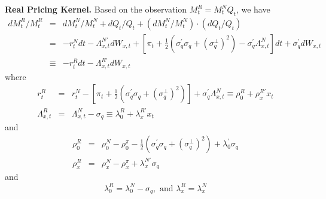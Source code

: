 \documentclass{article}
\begin{document}
\textbf{Real Pricing Kernel.} Based on the observation $%
M_{t}^{R}=M_{t}^{N}Q_{t}$, we have%
\begin{eqnarray*}
dM_{t}^{R}/M_{t}^{R} &=&dM_{t}^{N}/M_{t}^{N}+dQ_{t}/Q_{t}+\left(
dM_{t}^{N}/M_{t}^{N}\right) \cdot \left( dQ_{t}/Q_{t}\right)  \\
&=&-r_{t}^{N}dt-\Lambda _{x,t}^{N\prime }dW_{x,t}+\left[ \pi _{t}+\frac{1}{2}%
\left( \sigma _{q}^{\prime }\sigma _{q}+\left( \sigma _{q}^{\bot }\right)
^{2}\right) -\sigma _{q}^{\prime }\Lambda _{x,t}^{N}\right] dt+\sigma
_{q}^{\prime }dW_{x,t} \\
&\equiv &-r_{t}^{R}dt-\Lambda _{x,t}^{R\prime }dW_{x,t}
\end{eqnarray*}%
where 
\begin{eqnarray*}
r_{t}^{R} &=&r_{t}^{N}-\left[ \pi _{t}+\frac{1}{2}\left( \sigma _{q}^{\prime
}\sigma _{q}+\left( \sigma _{q}^{\bot }\right) ^{2}\right) \right] +\sigma
_{q}^{\prime }\Lambda _{x,t}^{N}\equiv \rho _{0}^{R}+\rho _{x}^{R\prime
}x_{t} \\
\Lambda _{x,t}^{R} &=&\Lambda _{x,t}^{N}-\sigma _{q}\equiv \lambda
_{0}^{R}+\lambda _{x}^{R\prime }x_{t}
\end{eqnarray*}%
and%
\begin{eqnarray*}
\rho _{0}^{R} &=&\rho _{0}^{N}-\rho _{0}^{\pi }-\frac{1}{2}\left( \sigma
_{q}^{\prime }\sigma _{q}+\left( \sigma _{q}^{\bot }\right) ^{2}\right)
+\lambda _{0}^{\prime }\sigma _{q} \\
\rho _{x}^{R} &=&\rho _{x}^{N}-\rho _{x}^{\pi }+\lambda _{x}^{N\prime
}\sigma _{q}
\end{eqnarray*}%
and 
\begin{equation*}
\lambda _{0}^{R}=\lambda _{0}^{N}-\sigma _{q},\text{ and }\lambda
_{x}^{R}=\lambda _{x}^{N}
\end{equation*}

\bigskip 
\end{document}
